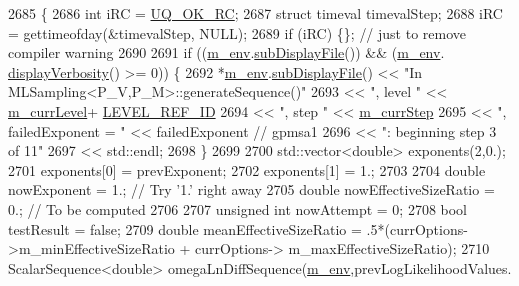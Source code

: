 \begin{DoxyCode}
2685 \{
2686   \textcolor{keywordtype}{int} iRC = \hyperlink{namespace_q_u_e_s_o_a8e909502900aecf24cedba022ea84471}{UQ\_OK\_RC};
2687   \textcolor{keyword}{struct }timeval timevalStep;
2688   iRC = gettimeofday(&timevalStep, NULL);
2689   \textcolor{keywordflow}{if} (iRC) \{\}; \textcolor{comment}{// just to remove compiler warning}
2690 
2691       \textcolor{keywordflow}{if} ((\hyperlink{class_q_u_e_s_o_1_1_m_l_sampling_a13f1ca4fe9f94822fe572a743eaced1d}{m\_env}.\hyperlink{class_q_u_e_s_o_1_1_base_environment_a8a0064746ae8dddfece4229b9ad374d6}{subDisplayFile}()) && (\hyperlink{class_q_u_e_s_o_1_1_m_l_sampling_a13f1ca4fe9f94822fe572a743eaced1d}{m\_env}.
      \hyperlink{class_q_u_e_s_o_1_1_base_environment_a1fe5f244fc0316a0ab3e37463f108b96}{displayVerbosity}() >= 0)) \{
2692         *\hyperlink{class_q_u_e_s_o_1_1_m_l_sampling_a13f1ca4fe9f94822fe572a743eaced1d}{m\_env}.\hyperlink{class_q_u_e_s_o_1_1_base_environment_a8a0064746ae8dddfece4229b9ad374d6}{subDisplayFile}() << \textcolor{stringliteral}{"In MLSampling<P\_V,P\_M>::generateSequence()"}
2693                                 << \textcolor{stringliteral}{", level "} << \hyperlink{class_q_u_e_s_o_1_1_m_l_sampling_af9416874c856e50f3b35270e801f17e4}{m\_currLevel}+
      \hyperlink{_m_l_sampling_level_options_8h_a68d15eaf394d210effcf584b938206d3}{LEVEL\_REF\_ID}
2694                                 << \textcolor{stringliteral}{", step "}  << \hyperlink{class_q_u_e_s_o_1_1_m_l_sampling_a1b1f8ccb4823bdfa26ec652f0807c63e}{m\_currStep}
2695                                 << \textcolor{stringliteral}{", failedExponent = "} << failedExponent \textcolor{comment}{// gpmsa1}
2696                                 << \textcolor{stringliteral}{": beginning step 3 of 11"}
2697                                 << std::endl;
2698       \}
2699 
2700       std::vector<double> exponents(2,0.);
2701       exponents[0] = prevExponent;
2702       exponents[1] = 1.;
2703 
2704       \textcolor{keywordtype}{double} nowExponent = 1.; \textcolor{comment}{// Try '1.' right away}
2705       \textcolor{keywordtype}{double} nowEffectiveSizeRatio = 0.; \textcolor{comment}{// To be computed}
2706 
2707       \textcolor{keywordtype}{unsigned} \textcolor{keywordtype}{int} nowAttempt = 0;
2708       \textcolor{keywordtype}{bool} testResult = \textcolor{keyword}{false};
2709       \textcolor{keywordtype}{double} meanEffectiveSizeRatio = .5*(currOptions->m\_minEffectiveSizeRatio + currOptions->
      m\_maxEffectiveSizeRatio);
2710       ScalarSequence<double> omegaLnDiffSequence(\hyperlink{class_q_u_e_s_o_1_1_m_l_sampling_a13f1ca4fe9f94822fe572a743eaced1d}{m\_env},prevLogLikelihoodValues.

\end{DoxyCode}
